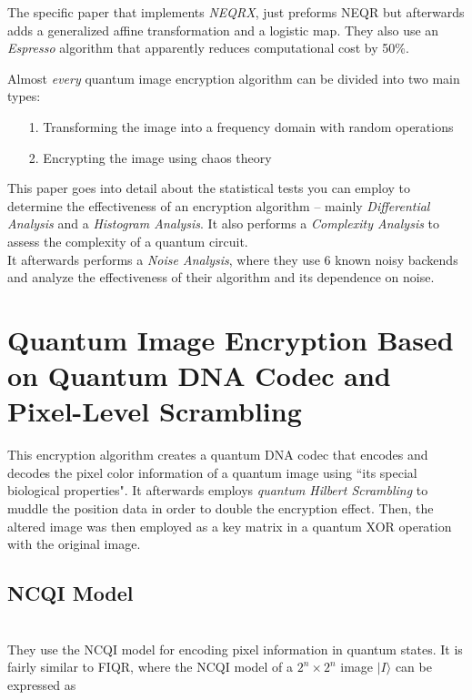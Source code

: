 \documentclass[svgnames]{article}     %
\begin{document}
The specific paper that implements \textit{NEQRX}, just preforms NEQR but
afterwards adds a generalized affine transformation and a logistic map. They
also use an \textit{Espresso} algorithm that apparently reduces computational
cost by 50\%. 

Almost \textit{every} quantum image encryption algorithm can be divided into
two main types: 

\begin{itemize}
  \item[1.] Transforming the image into a frequency domain with random
    operations
  \item[2.] Encrypting the image using chaos theory
\end{itemize}

This paper goes into detail about the statistical tests you can employ to
determine the effectiveness of an encryption algorithm -- mainly
\textit{Differential Analysis} and a \textit{Histogram Analysis}. It also
performs a \textit{Complexity Analysis} to assess the complexity of a quantum
circuit. \\

It afterwards performs a \textit{Noise Analysis}, where they use 6 known noisy
backends and analyze the effectiveness of their algorithm and its dependence on
noise.

\section{Quantum Image Encryption Based on Quantum DNA Codec and Pixel-Level
Scrambling}

This encryption algorithm creates a quantum DNA codec that encodes and decodes
the pixel color information of a quantum image using ``its special biological
properties". It afterwards employs \textit{quantum Hilbert Scrambling} to
muddle the position data in order to double the encryption effect. Then, the
altered image was then employed as a key matrix in a quantum XOR operation with
the original image. \\

\subsection{NCQI Model} \mbox{} \\

They use the NCQI model for encoding pixel information in quantum states. It is
fairly similar to FIQR, where the NCQI model of a $2^n \times 2^n$ image
$|I\rangle$ can be expressed as 
\end{document}
